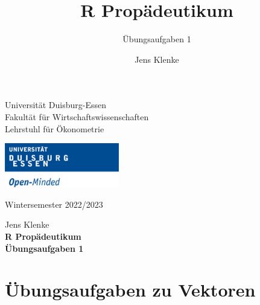 \documentclass[12pt,a4paper]{article}
\title{R Propädeutikum}
\subtitle{Übungsaufgaben 1}
\author{Jens Klenke}
\date{}
\begin{document}





\restoregeometry



\begin{minipage}{0.6\textwidth}
Universität Duisburg-Essen\\
Fakultät für Wirtschaftswissenschaften\\
Lehrstuhl für Ökonometrie\\
\end{minipage}

	\begin{flushright}
	\vspace{-3cm}
	\includegraphics*[width=5cm]{includes/duelogo_en.png}\\
	\vspace{.125cm}
	\end{flushright}
\hspace{-0.005cm}Wintersemester 2022/2023

\vspace{0.05cm}

\begin{center}
	\vspace{.25cm}
	Jens Klenke \hspace{.5cm}  \\
	\vspace{.25cm}
	\textbf{\Large{R Propädeutikum}}\\
	\vspace{.25cm}
	\textbf{\large{Übungsaufgaben 1}}\\
	\vspace{.125cm}
\end{center}





\hypertarget{uxfcbungsaufgaben-zu-vektoren}{%
\section{Übungsaufgaben zu
Vektoren}\label{uxfcbungsaufgaben-zu-vektoren}}
\end{document}
